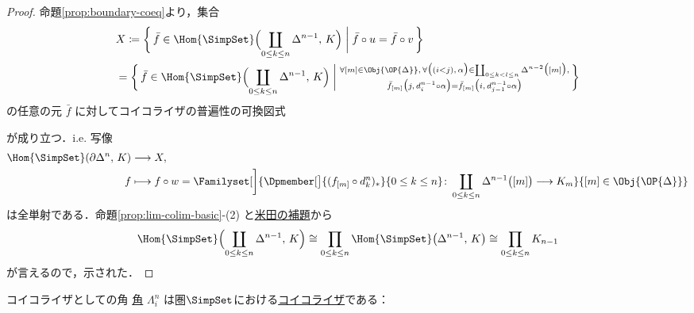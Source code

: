 \documentclass[TQFT_main]{subfiles}
\begin{document}
\begin{proof}
    命題\ref{prop:boundary-coeq}より，集合
    \begin{align}
        &X\coloneqq\biggl\{\, \bar{f} \in \Hom{\SimpSet}\Bigl(\coprod_{0 \le k \le n} \Delta^{n-1},\, K \Bigr) \biggm| \bar{f} \circ u = \bar{f} \circ v \,\biggr\}  \\
        &= \biggl\{\, \bar{f} \in \Hom{\SimpSet}\Bigl(\coprod_{0 \le k \le n} \Delta^{n-1},\, K \Bigr) \biggm| \substack{\forall [m] \in \Obj{\OP{\Delta}},\, \forall \bigl((i < j),\, \alpha\bigr) \in \coprod_{0 \le k < l \le n} \Delta^{n-2} \bigl( [m] \bigr),\\ \bar{f}_{[m]} \bigl( j,\, d^{n-1}_i \circ \alpha \bigr)  = \bar{f}_{[m]} \bigl( i,\, d^{n-1}_{j-1} \circ \alpha \bigr)}  \,\biggr\}
    \end{align}
    の任意の元 $\bar{f}$ に対してコイコライザの普遍性の可換図式
    \begin{center}
    \end{center}
    が成り立つ．i.e. 写像
    \begin{align}
        \Hom{\SimpSet} (\partial \Delta^n,\, K) &\lto X, \\
        f &\lmto f \circ w = \Familyset[\bigg]{\Dpmember[\big]{(f_{[m]} \circ d^n_k)_*}{0 \le k \le n} \colon \coprod_{0 \le k \le n} \Delta^{n-1} \bigl( [m] \bigr) \lto K_m}{[m] \in \Obj{\OP{\Delta}}}
    \end{align}
    は全単射である．命題\ref{prop:lim-colim-basic}-(2) と\hyperref[lem:Yoneda]{米田の補題}から
    \begin{align}
        \Hom{\SimpSet}\Bigl(\coprod_{0 \le k \le n} \Delta^{n-1},\, K \Bigr) \cong \prod_{0 \le k \le n} \Hom{\SimpSet} \bigl( \Delta^{n-1},\, K \bigr) \cong \prod_{0 \le k \le n} K_{n-1}
    \end{align}
    が言えるので，示された．
\end{proof}

\begin{myprop}[label=prop:horn-coeq]{コイコライザとしての角}
    \hyperref[def:horn]{角} $\Lambda^n_i$ は圏\hyperref[def:SimpSet]{$\SimpSet$}における\hyperref[def:eq-coeq]{コイコライザ}である：
    \begin{center}
    \end{center}
\end{myprop}
\end{document}
